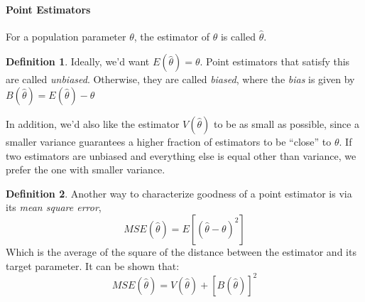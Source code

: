 \documentclass[12 pt]{article}
\theoremstyle{definition}
\newtheorem{defn}{Definition}
\begin{document}
        \paragraph{Point Estimators} For a population parameter
        $\theta$, the estimator of $\theta$ is called $\hat{\theta}$.
        \begin{defn}
        Ideally, we'd want $E(\hat{\theta}) = \theta$. Point
        estimators that satisfy this are called
        \textit{unbiased}. Otherwise, they are called \textit{biased},
        where the \textit{bias} is given by
        $B(\hat{\theta})=E(\hat{\theta})-\theta$
      \end{defn}
      In addition, we'd also like the estimator $V(\hat{\theta})$ to
      be as small as possible, since a smaller variance guarantees a
      higher fraction of estimators to be ``close'' to $\theta$. If
      two estimators are unbiased and everything else is equal other
      than variance, we prefer the one with smaller variance.
      \begin{defn}
        Another way to characterize goodness of a point estimator is
        via its \textit{mean square error},
        $$MSE(\hat{\theta}) = E[(\hat{\theta}-\theta)^2]$$
        Which is the average of the square of the distance between the
        estimator and its target parameter. It can be shown that:
        $$MSE(\hat{\theta})=V(\hat{\theta})+[B(\hat{\theta})]^2$$
      \end{defn}
\end{document}
